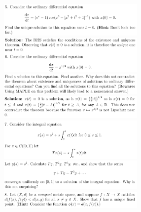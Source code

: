 \documentclass[8pt,landscape]{article}
\begin{document}
\begin{multicols}{3}
    \includegraphics[width=270]{126.png} \\
    \includegraphics[width=270]{127.png} \\
    \includegraphics[width=270]{128.png} \\
    \includegraphics[width=270]{129.png} \\
    \includegraphics[width=270]{130.png} \\
    \includegraphics[width=270]{131.png} \\
    \includegraphics[width=270]{132.png} \\

\end{multicols}
\end{document}
